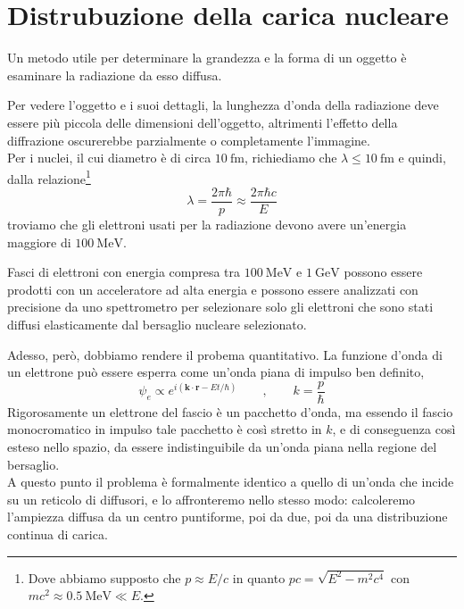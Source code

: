 \section{Distrubuzione della carica nucleare}

Un metodo utile per determinare la grandezza e la forma di un oggetto è esaminare la radiazione da esso diffusa. 

Per vedere l'oggetto e i suoi dettagli, la lunghezza d'onda della radiazione deve essere più piccola delle dimensioni dell'oggetto, altrimenti l'effetto della diffrazione oscurerebbe parzialmente o completamente l'immagine. \\
Per i nuclei, il cui diametro è di circa $10 \ \text{fm}$, richiediamo che $\lambda \leq  10 \ \text{fm}$ e quindi, dalla relazione\footnote{Dove abbiamo supposto che $p \approx E/c$ in quanto $pc = \sqrt{E^2 - m^2c^4}$ con $mc^2 \approx 0.5 \ \text{MeV} \ll E$.}
\begin{equation}
    \lambda = \frac{2\pi \hbar}{p} \approx \frac{2\pi \hbar c}{E}
\end{equation}
troviamo che gli elettroni usati per la radiazione devono avere un'energia maggiore di $100 \ \text{MeV}$. 

Fasci di elettroni con energia compresa tra $100 \ \text{MeV}$ e $1 \ \text{GeV}$ possono essere prodotti con un acceleratore ad alta energia e possono essere analizzati con precisione da uno spettrometro per selezionare solo gli elettroni che sono stati diffusi elasticamente dal bersaglio nucleare selezionato.

Adesso, però, dobbiamo rendere il probema quantitativo. La funzione d'onda di un elettrone può essere esperra come un'onda piana di impulso ben definito,
\begin{equation}
    \psi_e \propto e^{i(\mathbf{k}\cdot\mathbf{r} - Et/\hbar)} \qquad , \qquad k = \frac{p}{\hbar}
    \label{eq:onda_piana}
\end{equation}
Rigorosamente un elettrone del fascio è un pacchetto d'onda, ma essendo il fascio monocromatico in impulso tale pacchetto è così stretto in $k$, e di conseguenza così esteso nello spazio, da essere indistinguibile da un'onda piana nella regione del bersaglio.\\

A questo punto il problema è formalmente identico a quello di un'onda che incide su un reticolo di diffusori, e lo affronteremo nello stesso modo: calcoleremo l'ampiezza diffusa da un centro puntiforme, poi da due, poi da una distribuzione continua di carica.

